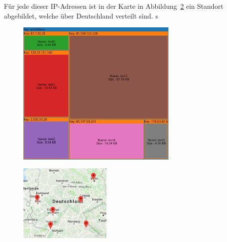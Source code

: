 \documentclass[
    fontsize=12pt,
    headings=small,
    parskip=half,           %
    bibliography=totoc,
    numbers=noenddot,       %
    open=any,               %
    ]{scrreprt}
\begin{document}
Für jede dieser IP-Adressen ist in der Karte in Abbildung~\ref{fig:TIpM} ein Standort abgebildet, welche über Deutschland verteilt sind. 
s
\begin{figure}[H]
\includegraphics[width=0.7\textwidth]{../pic/IP-Tor-SetB-tree2.PNG}
\label{fig:TIpTM}
\end{figure}

\begin{figure}[H]
\includegraphics[width=0.4\textwidth]{../pic/IP-Tor-SetB.PNG}
\label{fig:TIpM}
\end{figure}
\end{document}
